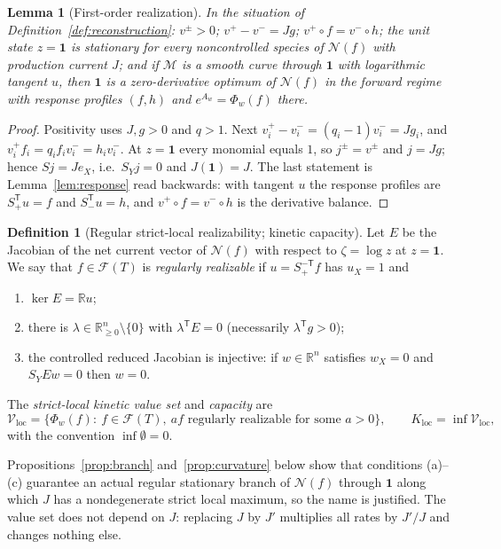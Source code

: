 \documentclass[11pt,reqno]{amsart}
\theoremstyle{plain}
\newtheorem{lemma}[theorem]{Lemma}
\theoremstyle{definition}
\newtheorem{definition}[theorem]{Definition}
\theoremstyle{remark}
\numberwithin{equation}{section}
\newcommand{\R}{\mathbb{R}}
\newcommand{\one}{\mathbf{1}}
\newcommand{\Ker}{\operatorname{ker}}
\newcommand{\Sp}{S_{+}}
\newcommand{\Sm}{S_{-}}
\newcommand{\T}{\mathsf{T}}
\newcommand{\cone}{\mathcal{F}}
\newcommand{\Vloc}{\mathcal{V}_{\mathrm{loc}}}
\newcommand{\Kloc}{K_{\mathrm{loc}}}
\renewcommand{\odot}{\circ}
\begin{document}
\begin{lemma}[First-order realization]\label{lem:firstorder}
In the situation of Definition~\ref{def:reconstruction}: $v^\pm>0$; $v^+-v^-=Jg$; $v^+\odot f=v^-\odot h$; the unit state $z=\one$ is stationary for every noncontrolled species of $\mathcal N(f)$ with production current $J$; and if $\mathcal M$ is a smooth curve through $\one$ with logarithmic tangent $u$, then $\one$ is a zero-derivative optimum of $\mathcal N(f)$ in the forward regime with response profiles $(f,h)$ and $e^{A_w}=\Phi_w(f)$ there.
\end{lemma}

\begin{proof}
Positivity uses $J,g>0$ and $q>1$.  Next $v^+_i-v^-_i=(q_i-1)v^-_i=Jg_i$, and $v^+_if_i=q_if_iv^-_i=h_iv^-_i$.  At $z=\one$ every monomial equals $1$, so $j^\pm=v^\pm$ and $j=Jg$; hence $Sj=Je_X$, i.e.\ $S_Yj=0$ and $J(\one)=J$.  The last statement is Lemma~\ref{lem:response} read backwards: with tangent $u$ the response profiles are $\Sp^{\T}u=f$ and $\Sm^{\T}u=h$, and $v^+\odot f=v^-\odot h$ is the derivative balance.
\end{proof}

\begin{definition}[Regular strict-local realizability; kinetic capacity]\label{def:realizable}
Let $E$ be the Jacobian of the net current vector of $\mathcal N(f)$ with respect to $\zeta=\log z$ at $z=\one$.  We say that $f\in\cone(T)$ is \emph{regularly realizable} if $u=\Sp^{-\T}f$ has $u_X=1$ and
\begin{enumerate}[label=(\alph*)]
\item $\Ker E=\R u$;
\item there is $\lambda\in\R^n_{\ge0}\setminus\{0\}$ with $\lambda^{\T}E=0$ (necessarily $\lambda^{\T}g>0$);
\item the controlled reduced Jacobian is injective: if $w\in\R^n$ satisfies $w_X=0$ and $S_YEw=0$ then $w=0$.
\end{enumerate}
The \emph{strict-local kinetic value set} and \emph{capacity} are
\[
\Vloc=\{\Phi_w(f):\ f\in\cone(T),\ af\text{ regularly realizable for some }a>0\},\qquad \Kloc=\inf\Vloc ,
\]
with the convention $\inf\emptyset=0$.
\end{definition}

Propositions~\ref{prop:branch} and~\ref{prop:curvature} below show that conditions (a)--(c) guarantee an actual regular stationary branch of $\mathcal N(f)$ through $\one$ along which $J$ has a nondegenerate strict local maximum, so the name is justified.  The value set does not depend on $J$: replacing $J$ by $J'$ multiplies all rates by $J'/J$ and changes nothing else.
\end{document}
